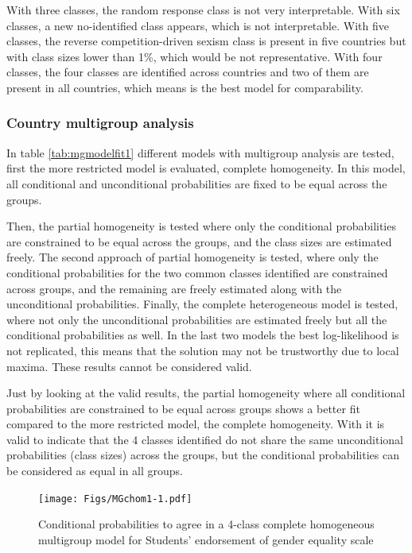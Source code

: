 \documentclass[12pt,a4paper,oneside]{reedthesis}
\begin{document}
With three classes, the random response class is not very interpretable. With six classes, a new no-identified class appears, which is not interpretable. With five classes, the reverse competition-driven sexism class is present in five countries but with class sizes lower than 1\%, which would be not representative. With four classes, the four classes are identified across countries and two of them are present in all countries, which means is the best model for comparability.

\newpage

\hypertarget{country-multigroup-analysis}{%
\subsubsection{Country multigroup analysis}\label{country-multigroup-analysis}}

In table \ref{tab:mgmodelfit1} different models with multigroup analysis are tested, first the more restricted model is evaluated, complete homogeneity. In this model, all conditional and unconditional probabilities are fixed to be equal across the groups.

Then, the partial homogeneity is tested where only the conditional probabilities are constrained to be equal across the groups, and the class sizes are estimated freely. The second approach of partial homogeneity is tested, where only the conditional probabilities for the two common classes identified are constrained across groups, and the remaining are freely estimated along with the unconditional probabilities. Finally, the complete heterogeneous model is tested, where not only the unconditional probabilities are estimated freely but all the conditional probabilities as well.
In the last two models the best log-likelihood is not replicated, this means that the solution may not be trustworthy due to local maxima. These results cannot be considered valid.

Just by looking at the valid results, the partial homogeneity where all conditional probabilities are constrained to be equal across groups shows a better fit compared to the more restricted model, the complete homogeneity. With it is valid to indicate that the 4 classes identified do not share the same unconditional probabilities (class sizes) across the groups, but the conditional probabilities can be considered as equal in all groups.
\begin{figure}
\centering
\texttt{[image: Figs/MGchom1-1.pdf]}
\caption{\label{fig:MGchom1}Conditional probabilities to agree in a 4-class complete homogeneous multigroup model for Students' endorsement of gender equality scale}
\end{figure}
\newpage
\end{document}
